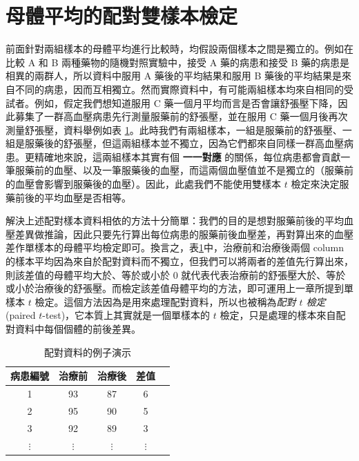 \section{母體平均的配對雙樣本檢定}
    前面針對兩組樣本的母體平均進行比較時，均假設兩個樣本之間是獨立的。例如在比較 A 和 B 兩種藥物的隨機對照實驗中，接受 A 藥的病患和接受 B 藥的病患是相異的兩群人，所以資料中服用 A 藥後的平均結果和服用 B 藥後的平均結果是來自不同的病患，因而互相獨立。然而實際資料中，有可能兩組樣本均來自相同的受試者。例如，假定我們想知道服用 C 藥一個月平均而言是否會讓舒張壓下降，因此募集了一群高血壓病患先行測量服藥前的舒張壓，並在服用 C 藥一個月後再次測量舒張壓，資料舉例如表 \ref{tab:paired_data}。此時我們有兩組樣本，一組是服藥前的舒張壓、一組是服藥後的舒張壓，但這兩組樣本並不獨立，因為它們都來自同樣一群高血壓病患。更精確地來說，這兩組樣本其實有個 \textbf{一一對應} 的關係，每位病患都會貢獻一筆服藥前的血壓、以及一筆服藥後的血壓，而這兩個血壓值並不是獨立的（服藥前的血壓會影響到服藥後的血壓）。因此，此處我們不能使用雙樣本 $t$ 檢定來決定服藥前後的平均血壓是否相等。

    \medskip

    解決上述配對樣本資料相依的方法十分簡單：我們的目的是想對服藥前後的平均血壓差異做推論，因此只要先行算出每位病患的服藥前後血壓差，再對算出來的血壓差作單樣本的母體平均檢定即可。換言之，表\ref{tab:paired_data}中，治療前和治療後兩個 column 的樣本平均因為來自於配對資料而不獨立，但我們可以將兩者的差值先行算出來，則該差值的母體平均大於、等於或小於 $0$ 就代表代表治療前的舒張壓大於、等於或小於治療後的舒張壓。而檢定該差值母體平均的方法，即可運用上一章所提到單樣本 $t$ 檢定。這個方法因為是用來處理配對資料，所以也被稱為\textit{配對 $t$ 檢定} (paired $t$-test)，它本質上其實就是一個單樣本的 $t$ 檢定，只是處理的樣本來自配對資料中每個個體的前後差異。

    \begin{table}[htbp]
        \begin{center}
            \begin{tabular}{ccccc}
                \toprule
                病患編號 & 治療前 & 治療後 & 差值 \\
                \hline
                1 & 93 & 87 & 6 \\
                2 & 95 & 90 & 5 \\
                3 & 92 & 89 & 3 \\
                $\vdots$ & $\vdots$ & $\vdots$ & $\vdots$ \\
                \bottomrule
            \end{tabular}
            \caption{配對資料的例子演示\label{tab:paired_data}}
        \end{center}
    \end{table}

